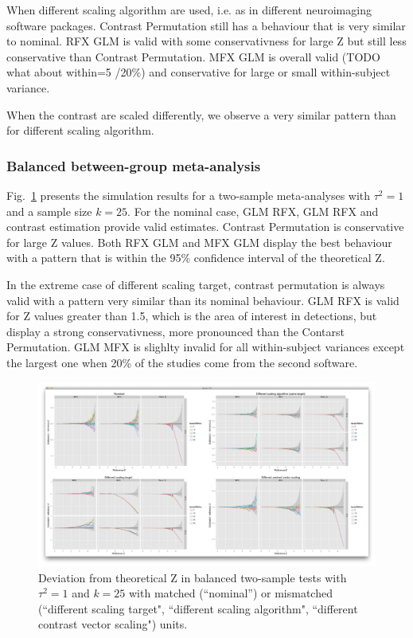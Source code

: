 \documentclass{llncs}
\newcommand{\nStudies}{k}
\newcommand{\varBetween}{\tau^2}
\begin{document}
When different scaling algorithm are used, i.e. as in different neuroimaging software packages. Contrast Permutation still has a behaviour that is very similar to nominal. RFX GLM is valid with some conservativness for large Z but still less conservative than Contrast Permutation. MFX GLM is overall valid (TODO what about within=5 /20\%) and conservative for large or small within-subject variance. 

When the contrast are scaled differently, we observe a very similar pattern than for different scaling algorithm.

\subsubsection{Balanced between-group meta-analysis}

Fig.~\ref{test2_k25_btw1} presents the simulation results for a two-sample meta-analyses with $\varBetween=1$ and a sample size $\nStudies = 25$. For the nominal case, GLM RFX, GLM RFX and contrast estimation provide valid estimates. Contrast Permutation is conservative for large Z values. Both RFX GLM and MFX GLM display the best behaviour with a pattern that is within the 95\% confidence interval of the theoretical Z.

In the extreme case of different scaling target, contrast permutation is always valid with a pattern very similar than its nominal behaviour. GLM RFX is valid for Z values greater than 1.5, which is the area of interest in detections, but display a strong conservativness, more pronounced than the Contarst Permutation. GLM MFX is slighlty invalid for all within-subject variances except the largest one when 20\% of the studies come from the second software.

\begin{figure}[t]
	\centering
	\includegraphics[width=0.99\linewidth]{./figures/test2_k25_btw1.png}
	\caption{Deviation from theoretical Z in balanced two-sample tests with $\varBetween=1$ and $\nStudies = 25$ with matched (``nominal'') or mismatched (``different scaling target", ``different scaling algorithm", ``different contrast vector scaling") units.}
	\label{test2_k25_btw1}
\end{figure}
\end{document}
